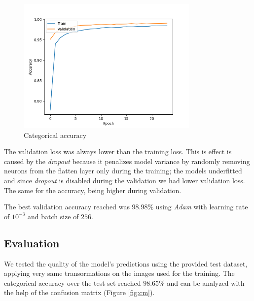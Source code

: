 \documentclass[compsoc]{IEEEtran}
\begin{document}
\begin{figure}[ht!]
\centering                                                                        
\includegraphics[width=3.5in]{acc.png}
\captionsetup{justification=centering}                                                                                         
\caption{Categorical accuracy}
\label{fig:acc}                                                                                                                               
\end{figure}

The validation loss was always lower than the training loss. This is effect is caused by the \emph{dropout} because it penalizes model variance by randomly removing neurons from the flatten layer only during the training; the models underfitted and since \emph{dropout} is disabled during the validation we had lower validation loss. The same for the accuracy, being higher during validation.\par
The best validation accuracy reached was $98.98\%$ using \emph{Adam} with learning rate of $10^{-3}$ and batch size of $256$.


\subsection{Evaluation}
We tested the quality of the model's predictions using the provided test dataset, applying very same transormations on the images used for the training.
The categorical accuracy 
over the test set reached $98.65\%$ and can be analyzed with the help of the confusion matrix (Figure \ref{fig:cm}). 
\end{document}
